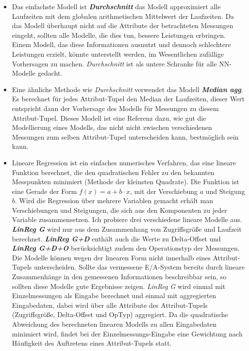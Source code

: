 \documentclass[
	twoside,
	12pt,
	a4paper,
	BCOR10mm,
	DIV14,
	listof=totoc,
	bibliography=totoc,
	headsepline
]{scrreprt}
\begin{document}
\begin{itemize}
	\item Das einfachste Modell ist \textit{\textbf{Durchschnitt}} das Modell approximiert alle Laufzeiten mit dem globalen arithmetischen Mittelwert der Laufzeiten.
Da das Modell überhaupt nicht auf die Attribute der betrachteten Messungen eingeht, sollten alle Modelle, die dies tun, bessere Leistungen erbringen. Einem Modell, das diese Informationen ausnutzt und dennoch schlechtere Leistungen erzielt, könnte unterstellt werden, im Wesentlichen zufällige Vorhersagen zu machen.
\textit{Durchschnitt} ist als untere Schranke für alle NN-Modelle gedacht.
	\item Eine ähnliche Methode wie \textit{Durchschnitt} verwendet das Modell \textit{\textbf{Median agg}}. Es berechnet für jedes Attribut-Tupel den Median der Laufzeiten, dieser Wert entspricht dann der Vorhersage des Modells für Messungen zu diesem Attribut-Tupel.
Dieses Modell ist eine Referenz dazu, wie gut die Modellierung eines Modells, das nicht nicht zwischen verschiedenen Messungen zum selben Attribut-Tupel unterscheiden kann, bestmöglich sein kann.
	\item Lineare Regression ist ein einfaches numerisches Verfahren, das eine lineare Funktion berechnet, die den quadratischen Fehler zu den bekannten Messpunkten minimiert (Methode der kleinsten Quadrate).
Die Funktion ist eine Gerade der Form $f(x) = a + b \cdot x$, mit der Verschiebung $a$ und Steigung $b$. Wird die Regression über mehrere Variablen gemacht erhält man Verschiebungen und Steigungen, die sich aus den Komponenten zu jeder Variable zusammensetzen.
Ich probiere drei verschiedene lineare Modelle aus.
\textit{\textbf{LinReg G}} wird nur aus dem Zusammenhang von Zugriffsgröße und Laufzeit berechnet.
\textit{\textbf{LinReg G+D}} enthält auch die Werte zu Delta-Offset und \textit{\textbf{LinReg G+D+O}} berücksichtigt zudem den Operationstyp der Messungen.
Die Modelle können wegen der linearen Form nicht innerhalb eines Attribut-Tupels unterscheiden. Sollte das vermessene E/A-System bereits durch lineare Zusammenhänge in den gemessenen Informationen beschreibbar sein, so sollten diese Modelle gute Ergebnisse zeigen.
\textit{LinReg G} wird einmal mit Einzelmessungen als Eingabe berechnet und einmal mit aggregierten Eingabedaten, dabei wird über alle Attribute des Attribut-Tupels (Zugriffsgröße, Delta-Offset und OpTyp) aggregiert. 
Da die quadratische Abweichung des berechneten linearen Modells zu allen Eingabedaten minimiert wird, findet bei der Einzelmessungs-Eingabe eine Gewichtung nach Häufigkeit des Auftretens eines Attribut-Tupels statt.

\end{itemize}
\end{document}
